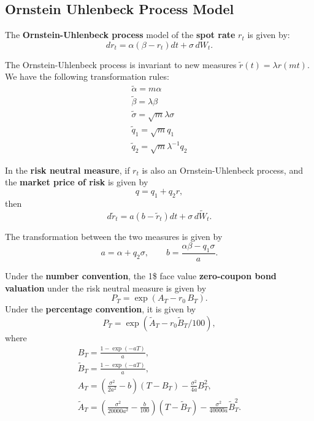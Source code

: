 \documentclass[10pt]{article}
\begin{document}
\subsection{Ornstein Uhlenbeck Process Model}
\begin{outline}
  \1 The \textbf{Ornstein-Uhlenbeck process} model of the \textbf{spot rate} $r_t$ is
  given by:
  \begin{equation*}
    dr_t = \alpha(\beta - r_t)dt + \sigma\,dW_t.
  \end{equation*}

  \1 The Ornstein-Uhlenbeck process is invariant to new measures
  $\tilde r(t) = \lambda r(mt)$. We have the following transformation rules:
  \begin{gather*}
    \tilde\alpha = m\alpha\\
    \tilde\beta = \lambda\beta\\
    \tilde\sigma = \sqrt{m}\lambda\sigma\\
    \tilde q_1 = \sqrt{m}q_1\\
    \tilde q_2 = \sqrt{m}\lambda^{-1}q_2
  \end{gather*}

  \1 In the \textbf{risk neutral measure}, if $r_t$ is also an Ornstein-Uhlenbeck process,
  and the \textbf{market price of risk} is given by
  \begin{equation*}
    q = q_1 + q_2r,
  \end{equation*}
  then
  \begin{equation*}
    d\tilde r_t = a(b - \tilde r_t)dt + \sigma\,d\tilde W_t.
  \end{equation*}

  \1 The transformation between the two measures is given by
  \begin{equation*}
    a = \alpha + q_2\sigma,\qquad b = \frac{\alpha\beta - q_1\sigma}{a}.
  \end{equation*}

  \1 Under the \textbf{number convention}, the 1\$ face value \textbf{zero-coupon bond
    valuation} under the risk neutral measure is given by
  \begin{equation*}
    P_T = \exp(A_T - r_0\,B_T).
  \end{equation*}
  Under the \textbf{percentage convention}, it is given by
  \begin{equation*}
    P_T = \exp(\tilde A_T - r_0\tilde B_T/100),
  \end{equation*}
  where
  \begin{gather*}
    B_T = \frac{1-\exp(-aT)}{a},\\
    \tilde B_T = \frac{1-\exp(-aT)}{a},\\
    A_T = \left(\frac{\sigma^2}{2a^2}-b\right)(T - B_T) - \frac{\sigma^2}{4a}B_T^2,\\
    \tilde A_T = \left(\frac{\sigma^2}{\num{20000}a^2}-\frac{b}{100}\right)(T - \tilde
    B_T) - \frac{\sigma^2}{\num{40000}a} \tilde B_T^2.
  \end{gather*}


\end{outline}
\end{document}
